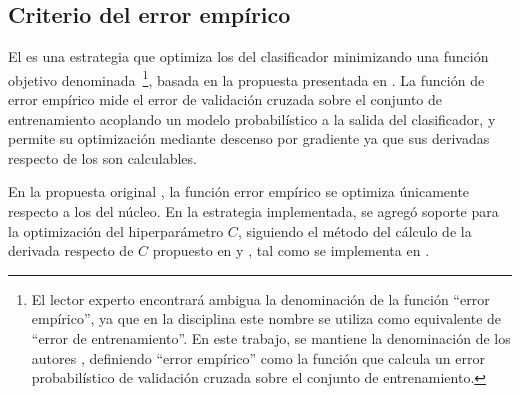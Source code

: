 %
%
\subsection{Criterio del error empírico}
%
El  es una estrategia que optimiza los
 del clasificador minimizando una función objetivo
denominada \,\footnote{
  El lector experto encontrará ambigua la denominación de la función
  ``error empírico'', ya que en la disciplina este nombre se utiliza
  como equivalente de ``error de entrenamiento''.
  En este trabajo, se mantiene la denominación de los autores
  \cite{ayat}, definiendo ``error empírico'' como la función que
  calcula un error probabilístico de validación cruzada sobre el
  conjunto de entrenamiento.
}, basada en la propuesta presentada en \cite{ayat}.
La función de error empírico mide el error de validación cruzada sobre
el conjunto de entrenamiento acoplando un modelo probabilístico a la
salida del clasificador, y permite su optimización mediante descenso
por gradiente ya que sus derivadas respecto de los  son
calculables.

En la propuesta original \cite{ayat}, la función {error empírico} se
optimiza únicamente respecto a los  del núcleo.
En la estrategia implementada, se agregó soporte para la optimización
del hiperparámetro $C$, siguiendo el método del cálculo de la derivada
respecto de $C$ propuesto en \cite{keerthi} y \cite{glasmachers}, tal
como se implementa en \cite{shark}.
